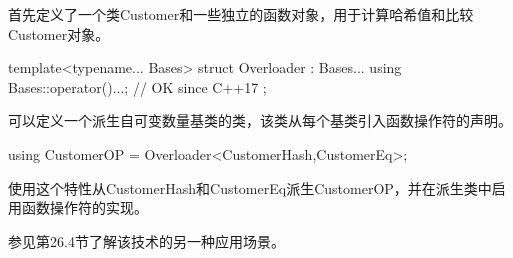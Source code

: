 首先定义了一个类Customer和一些独立的函数对象，用于计算哈希值和比较Customer对象。

\begin{cpp}
template<typename... Bases>
struct Overloader : Bases...
{
	using Bases::operator()...; // OK since C++17
};
\end{cpp}

可以定义一个派生自可变数量基类的类，该类从每个基类引入函数操作符的声明。

\begin{cpp}
using CustomerOP = Overloader<CustomerHash,CustomerEq>;
\end{cpp}

使用这个特性从CustomerHash和CustomerEq派生CustomerOP，并在派生类中启用函数操作符的实现。

参见第26.4节了解该技术的另一种应用场景。


























